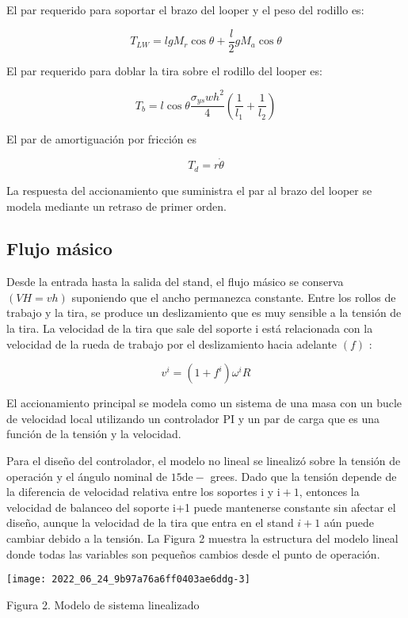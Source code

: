 El par requerido para soportar el brazo del looper y el peso del rodillo es:

$$
T_{L W}=l g M_{r} \cos \theta+\frac{l}{2} g M_{a} \cos \theta
$$

El par requerido para doblar la tira sobre el rodillo del looper es:

$$
T_{b}=l \cos \theta \frac{\sigma_{y s} w h^{2}}{4}\left(\frac{1}{l_{1}}+\frac{1}{l_{2}}\right)
$$

El par de amortiguación por fricción es

$$
T_{d}=r \dot{\theta}
$$

La respuesta del accionamiento que suministra el par al brazo del looper se modela mediante un retraso de primer orden.

\subsection{Flujo másico}
Desde la entrada hasta la salida del stand, el flujo másico se conserva $(V H=v h)$ suponiendo que el ancho permanezca constante. Entre los rollos de trabajo y la tira, se produce un deslizamiento que es muy sensible a la tensión de la tira. La velocidad de la tira que sale del soporte $\mathrm{i}$ está relacionada con la velocidad de la rueda de trabajo por el deslizamiento hacia adelante $(f)$ :

$$
v^{i}=\left(1+f^{i}\right) \omega^{i} R
$$

El accionamiento principal se modela como un sistema de una masa con un bucle de velocidad local utilizando un controlador PI y un par de carga que es una función de la tensión y la velocidad.

Para el diseño del controlador, el modelo no lineal se linealizó sobre la tensión de operación y el ángulo nominal de $ 15 \mathrm{de}-$ grees. Dado que la tensión depende de la diferencia de velocidad relativa entre los soportes $\mathrm{i}$ y $\mathrm{i}+1$, entonces la velocidad de balanceo del soporte i+1 puede mantenerse constante sin afectar el diseño, aunque la velocidad de la tira que entra en el stand $i+1$ aún puede cambiar debido a la tensión. La Figura 2 muestra la estructura del modelo lineal donde todas las variables son pequeños cambios desde el punto de operación.

\begin{center}
\texttt{[image: 2022\_06\_24\_9b97a76a6ff0403ae6ddg-3]}
\end{center}

Figura 2. Modelo de sistema linealizado

